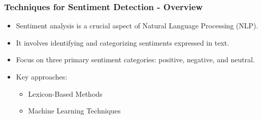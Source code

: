 \documentclass[aspectratio=169]{beamer}
\begin{document}
\begin{frame}
    \titlepage
\end{frame}

\begin{frame}
    \frametitle{Techniques for Sentiment Detection - Overview}
    \begin{itemize}
        \item Sentiment analysis is a crucial aspect of Natural Language Processing (NLP).
        \item It involves identifying and categorizing sentiments expressed in text.
        \item Focus on three primary sentiment categories: positive, negative, and neutral.
        \item Key approaches:
        \begin{itemize}
            \item Lexicon-Based Methods
            \item Machine Learning Techniques
        \end{itemize}
    \end{itemize}
\end{frame}
\end{document}
